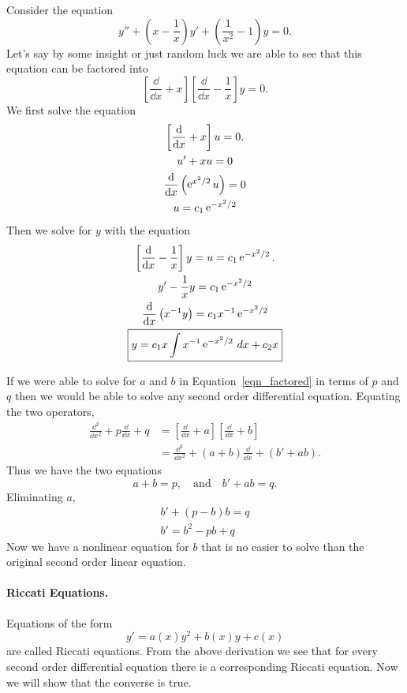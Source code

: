 \begin{Example}
  Consider the equation
  \[y'' + \left(x - \frac{1}{x}\right)y' + \left(\frac{1}{x^2} - 1\right)y=0.\]
  Let's say by some insight or just random luck we are able to see that 
  this equation can be factored into
  \[ \left[\frac{\dd}{\dd x} + x \right]\left[\frac{\dd}{\dd x} - \frac{1}{x} \right]y=0.\]
  We first solve the equation
  \begin{gather*}
    \left[\frac{\mathrm{d}}{\mathrm{d} x} + x \right] u = 0. \\
    u' + x u = 0 \\
    \frac{\mathrm{d}}{\mathrm{d} x} \left(\mathop{\mathrm{e}}\nolimits^{x^2/2} u\right) = 0 \\
    u = c_1 \mathop{\mathrm{e}}\nolimits^{-x^2/2}
  \end{gather*}
  Then we solve for $y$ with the equation
  \begin{gather*}
    \left[\frac{\mathrm{d}}{\mathrm{d} x} - \frac{1}{x} \right]y = u = c_1 \mathop{\mathrm{e}}\nolimits^{-x^2/2}. \\
    y' - \frac{1}{x} y = c_1 \mathop{\mathrm{e}}\nolimits^{-x^2/2} \\
    \frac{\mathrm{d}}{\mathrm{d} x} \left(x^{-1} y\right) = c_1 x^{-1} \mathop{\mathrm{e}}\nolimits^{-x^2/2} \\
    \boxed{y = c_1 x \int x^{-1} \mathop{\mathrm{e}}\nolimits^{-x^2/2}\,d x + c_2 x}
  \end{gather*}
\end{Example}


If we were able to solve for $a$ and $b$ 
in Equation~\ref{eqn_factored} in terms of $p$ and $q$
then we would be able to solve any second order differential equation.  
Equating the two operators, 
\begin{align*}
  \frac{\dd^2}{\dd x^2} + p \frac{\dd}{\dd x} + q 
  &= \left[\frac{\dd}{\dd x} + a \right]
  \left[\frac{\dd}{\dd x} + b\right] \\
  &= \frac{\dd^2}{\dd x^2} + (a + b)\frac{\dd}{\dd x} 
  + (b' + a b).
\end{align*}
Thus we have the two equations
\[ a + b = p, \quad \mathrm{and} \quad 
b' + a b = q. \]
Eliminating $a$, 
\begin{gather*}
  b' + (p - b) b = q \\
  b' = b^2 - p b + q
\end{gather*}
Now we have a nonlinear equation for $b$ 
that is no easier to solve than the original
second order linear equation.

\paragraph{Riccati Equations.}
Equations of the form
\[ y' = a(x) y^2 + b(x) y + c(x)\]
are called Riccati equations.  From the above derivation we see that for
every second order differential equation there is a corresponding Riccati
equation.  Now we will show that the converse is true.

